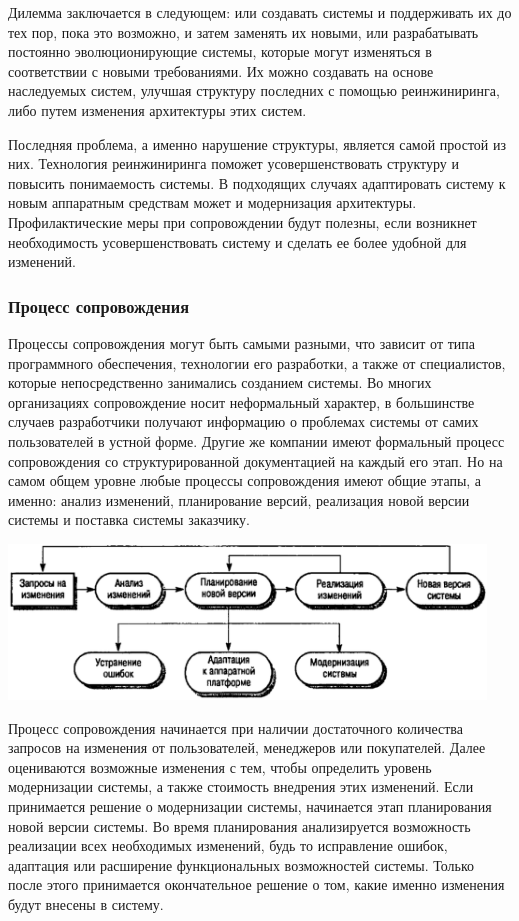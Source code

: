 \documentclass{../../text-style}
\begin{document}
Дилемма заключается в следующем: или создавать системы и поддерживать их до тех пор, пока это возможно, и затем заменять их новыми, или разрабатывать постоянно эволюционирующие системы, которые могут изменяться в соответствии с новыми требованиями. Их можно создавать на основе наследуемых систем, улучшая структуру последних с помощью реинжиниринга, либо путем изменения архитектуры этих систем.

Последняя проблема, а именно нарушение структуры, является самой простой из них. Технология реинжиниринга поможет усовершенствовать структуру и повысить понимаемость системы. В подходящих случаях адаптировать систему к новым аппаратным средствам может и модернизация архитектуры. Профилактические меры при сопровождении будут полезны, если возникнет необходимость усовершенствовать систему и сделать ее более удобной для изменений.

\subsubsection{Процесс сопровождения}

Процессы сопровождения могут быть самыми разными, что зависит от типа программного обеспечения, технологии его разработки, а также от специалистов, которые непосредственно занимались созданием системы. Во многих организациях сопровождение носит неформальный характер, в большинстве случаев разработчики получают информацию о проблемах системы от самих пользователей в устной форме. Другие же компании имеют формальный процесс сопровождения со структурированной документацией на каждый его этап. Но на самом общем уровне любые процессы сопровождения имеют общие этапы, а именно: анализ изменений, планирование версий, реализация новой версии системы и поставка системы заказчику.

\begin{center}
    \includegraphics[width=0.95\textwidth]{maintenanceProcess.png}
\end{center}

Процесс сопровождения начинается при наличии достаточного количества запросов на изменения от пользователей, менеджеров или покупателей. Далее оцениваются возможные изменения с тем, чтобы определить уровень модернизации системы, а также стоимость внедрения этих изменений. Если принимается решение о модернизации системы, начинается этап планирования новой версии системы. Во время планирования анализируется возможность реализации всех необходимых изменений, будь то исправление ошибок, адаптация или расширение функциональных возможностей системы. Только после этого принимается окончательное решение о том, какие именно изменения будут внесены в систему.
\end{document}
